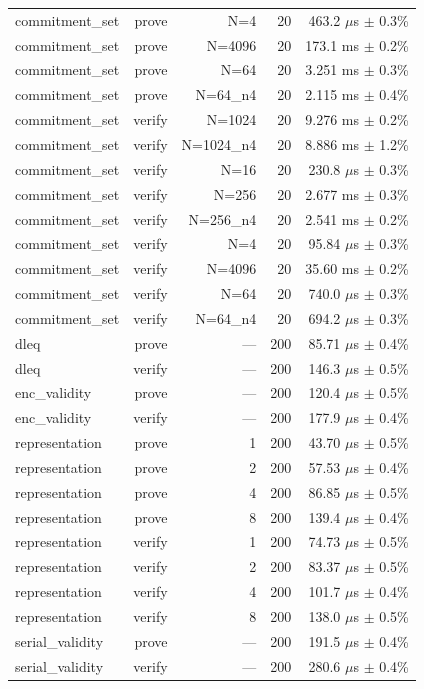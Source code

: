 \begin{table}[h]
\begin{tabular}{lrrrr}
commitment\_set & prove & N=4 & 20 & 463.2 $\mu$s $\pm$ 0.3\% \\
commitment\_set & prove & N=4096 & 20 & 173.1 ms $\pm$ 0.2\% \\
commitment\_set & prove & N=64 & 20 & 3.251 ms $\pm$ 0.3\% \\
commitment\_set & prove & N=64\_n4 & 20 & 2.115 ms $\pm$ 0.4\% \\
commitment\_set & verify & N=1024 & 20 & 9.276 ms $\pm$ 0.2\% \\
commitment\_set & verify & N=1024\_n4 & 20 & 8.886 ms $\pm$ 1.2\% \\
commitment\_set & verify & N=16 & 20 & 230.8 $\mu$s $\pm$ 0.3\% \\
commitment\_set & verify & N=256 & 20 & 2.677 ms $\pm$ 0.3\% \\
commitment\_set & verify & N=256\_n4 & 20 & 2.541 ms $\pm$ 0.2\% \\
commitment\_set & verify & N=4 & 20 & 95.84 $\mu$s $\pm$ 0.3\% \\
commitment\_set & verify & N=4096 & 20 & 35.60 ms $\pm$ 0.2\% \\
commitment\_set & verify & N=64 & 20 & 740.0 $\mu$s $\pm$ 0.3\% \\
commitment\_set & verify & N=64\_n4 & 20 & 694.2 $\mu$s $\pm$ 0.3\% \\
dleq & prove & — & 200 & 85.71 $\mu$s $\pm$ 0.4\% \\
dleq & verify & — & 200 & 146.3 $\mu$s $\pm$ 0.5\% \\
enc\_validity & prove & — & 200 & 120.4 $\mu$s $\pm$ 0.5\% \\
enc\_validity & verify & — & 200 & 177.9 $\mu$s $\pm$ 0.4\% \\
representation & prove & 1 & 200 & 43.70 $\mu$s $\pm$ 0.5\% \\
representation & prove & 2 & 200 & 57.53 $\mu$s $\pm$ 0.4\% \\
representation & prove & 4 & 200 & 86.85 $\mu$s $\pm$ 0.5\% \\
representation & prove & 8 & 200 & 139.4 $\mu$s $\pm$ 0.4\% \\
representation & verify & 1 & 200 & 74.73 $\mu$s $\pm$ 0.5\% \\
representation & verify & 2 & 200 & 83.37 $\mu$s $\pm$ 0.5\% \\
representation & verify & 4 & 200 & 101.7 $\mu$s $\pm$ 0.4\% \\
representation & verify & 8 & 200 & 138.0 $\mu$s $\pm$ 0.5\% \\
serial\_validity & prove & — & 200 & 191.5 $\mu$s $\pm$ 0.4\% \\
serial\_validity & verify & — & 200 & 280.6 $\mu$s $\pm$ 0.4\% \\
    \bottomrule
  \end{tabular}
\end{table}
